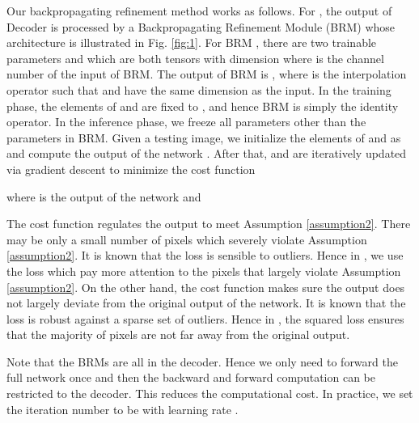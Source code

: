 \documentclass{article}
\theoremstyle{plain}
\begin{document}
Our backpropagating refinement method works as follows.
For ,
the output of Decoder  is processed by a Backpropagating Refinement Module (BRM)
whose
architecture is illustrated in Fig. \ref{fig:1}.
For BRM , there are two trainable parameters  and  which are both tensors with dimension  where  is the channel number of the input of BRM.
The output of BRM is ,
where   is the interpolation operator such that  and  have the same dimension as the input.
In the training phase, the elements of  and  are fixed to , and hence BRM is simply the identity operator.
In the inference phase,
we freeze all parameters other than the parameters in BRM.
Given a testing image,
we initialize the elements of  and  as 
and compute the output of the network .
After that,  and  are iteratively updated 
via gradient descent
to minimize the cost function
{\small
    
}where  is the output of the network and 
{\small
    
}The cost function  regulates the output to meet Assumption \ref{assumption2}.
There may be only a small number of pixels which severely violate Assumption \ref{assumption2}.
It is known that the  loss is sensible to outliers.
Hence in , we use the  loss which pay more attention to the pixels that largely violate Assumption \ref{assumption2}.
On the other hand, the cost function  makes sure the output does not largely deviate from the original output of the network.
It is known that the  loss is robust against a sparse set of outliers.
Hence in , 
the squared  loss ensures that the majority of pixels are not far away from the original output.


Note that the BRMs are all in the decoder.
Hence we only need to forward the full network once and then the backward and forward computation can be restricted to the decoder.
This reduces the computational cost.
In practice, we set the iteration number to be  with learning rate .
\end{document}
